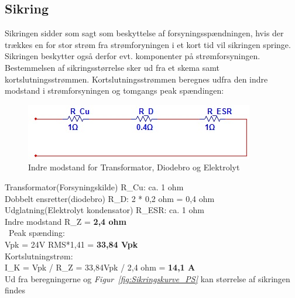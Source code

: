 \subsection{Sikring}
Sikringen sidder som sagt som beskyttelse af forsyningsspændningen, hvis der trækkes en for stor strøm fra strømforyningen i et kort tid vil sikringen springe. Sikringen beskytter også derfor evt. komponenter på strømforsyningen. Bestemmelsen af sikringsstørrelse sker ud fra et skema samt kortslutningsstrømmen. Kortslutningsstrømmen beregnes udfra den indre modstand i strømforsyningen og tomgangs peak spændingen: \\
\begin{figure}[H]
\centering
\includegraphics[scale=0.8]{billeder/Indre_modstand}
\caption{Indre modstand for Transformator, Diodebro og Elektrolyt}
\label{fig:Indre_modstand}
\end{figure}
Transformator(Forsyningskilde) R\_Cu: ca. 1 ohm \\
Dobbelt ensretter(diodebro) R\_D: 2 * 0,2 ohm = 0,4 ohm \\
Udglatning(Elektrolyt kondensator) R\_ESR: ca. 1 ohm \\
Indre modstand R\_Z = \textbf{2,4 ohm}\\ \
Peak spænding:\\
Vpk = 24V RMS*1,41 = \textbf{33,84 Vpk} \\
Kortslutningstrøm:\\
I\_K = Vpk / R\_Z = 33,84Vpk / 2,4 ohm = \textbf{14,1 A} \\
\newpage 
Ud fra beregningerne og \textit{Figur~\ref{fig:Sikringskurve_PS}} kan størrelse af sikringen findes 
